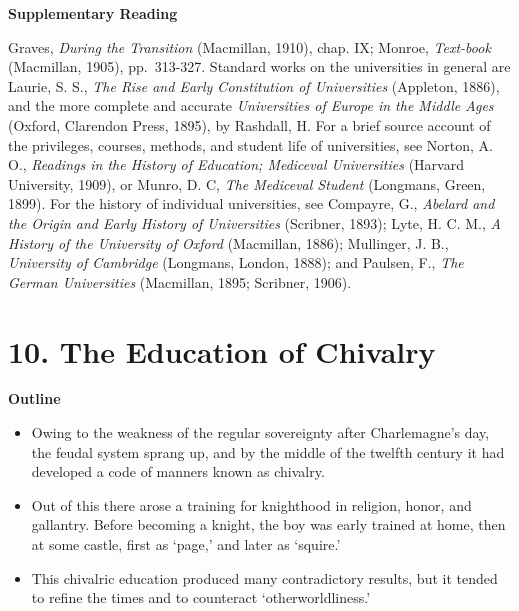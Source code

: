 \documentclass[]{book}
\providecommand{\tightlist}{%
  \setlength{\itemsep}{0pt}\setlength{\parskip}{0pt}}
\begin{document}
\textbf{Supplementary Reading}

Graves, \emph{During the Transition} (Macmillan, 1910), chap. IX; Monroe, \emph{Text-book} (Macmillan, 1905), pp.~313-327. Standard works on the universities in general are Laurie, S. S., \emph{The Rise and Early Constitution of Universities} (Appleton, 1886), and the more complete and accurate \emph{Universities of Europe in the Middle Ages} (Oxford, Clarendon Press, 1895), by Rashdall, H. For a brief source account of the privileges, courses, methods, and student life of universities, see Norton, A. O., \emph{Readings in the History of Education; Mediceval Universities} (Harvard University, 1909), or Munro, D. C, \emph{The Mediceval Student} (Longmans, Green, 1899). For the history of individual universities, see Compayre, G.,\protect\hypertarget{ch9.xmlux5cux23para.125.1.0.box.327.250.1048.219.q.50}{}{ \emph{Abelard and the Origin and Early History of Universities} (Scribner, 1893); Lyte, H. C. M., \emph{A History of the University of Oxford} (Macmillan, 1886); Mullinger, J. B., \emph{University of Cambridge} (Longmans, London, 1888); and Paulsen, F., \emph{The German Universities} (Macmillan, 1895; Scribner, 1906).}

\hypertarget{the-education-of-chivalry}{%
\chapter{10. The Education of Chivalry}\label{the-education-of-chivalry}}

\textbf{Outline}

\begin{itemize}
\tightlist
\item
  Owing to the weakness of the regular sovereignty after Charlemagne's day, the feudal system sprang up, and by the middle of the twelfth century it had developed a code of manners known as chivalry.
\item
  Out of this there arose a training for knighthood in religion, honor, and gallantry. Before becoming a knight, the boy was early trained at home, then at some castle, first as `page,' and later as `squire.'
\item
  This chivalric education produced many contradictory results, but it tended to refine the times and to counteract `otherworldliness.'
\end{itemize}
\end{document}
